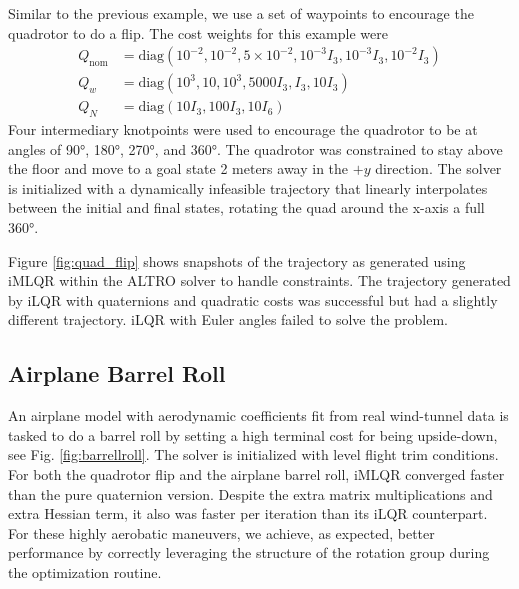 \documentclass{svproc}
\begin{document}
	    Similar to the previous example, we use a set of waypoints to encourage the quadrotor to do a flip. The cost weights for this example were 
	    \begin{align*}
	        Q_\text{nom} &= \text{diag}(10^{-2},10^{-2},5 \times 10^{-2}, 10^{-3} I_3, 10^{-3} I_3, 10^{-2} I_3) \\
	        Q_w &= \text{diag}(10^3, 10, 10^3, 5000 I_3, I_3, 10 I_3) \\
	        Q_N &= \text{diag}(10 I_3, 100 I_3, 10 I_6)  
	    \end{align*}
	    Four intermediary knotpoints were used to encourage the quadrotor to be at angles of \ang{90},  \ang{180}, \ang{270}, and \ang{360}. The quadrotor was constrained to stay above the floor and move to a goal state 2 meters away in the $+y$ direction. The solver is initialized with a dynamically infeasible trajectory that linearly interpolates between the initial and final states, rotating the quad around the x-axis a full \ang{360}.
	    
	    Figure \ref{fig:quad_flip} shows snapshots of the trajectory as generated using iMLQR within the ALTRO solver to handle constraints. The trajectory generated by iLQR with quaternions and quadratic costs was successful but had a slightly different trajectory. iLQR with Euler angles failed to solve the problem. 
        
        \subsection{Airplane Barrel Roll}
        An airplane model with aerodynamic coefficients fit from real wind-tunnel data is tasked to do a barrel roll by setting a high terminal cost for being upside-down, see Fig. \ref{fig:barrellroll}.
        The solver is initialized with level flight trim conditions. 
        For both the quadrotor flip and the airplane barrel roll, iMLQR converged faster than the pure quaternion version. Despite the extra matrix multiplications and extra Hessian term, it also was faster per iteration than its iLQR counterpart. For these highly aerobatic maneuvers, we achieve, as expected, better performance by correctly leveraging the structure of the rotation group during the optimization routine.
        
\end{document}
